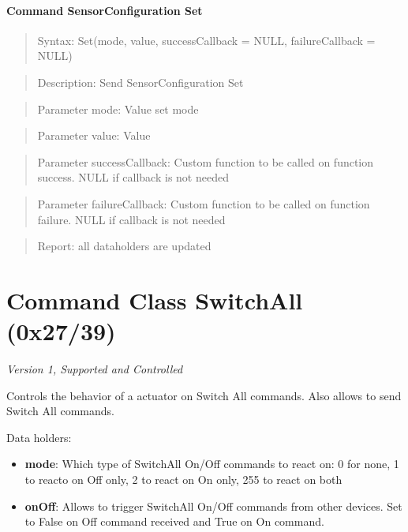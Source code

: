 \paragraph{Command SensorConfiguration Set}
\begin{quote}Syntax: Set(mode, value, successCallback = NULL, failureCallback = NULL)\end{quote}
\begin{quote}Description: Send SensorConfiguration Set\end{quote}
\begin{quote}Parameter mode: Value set mode\end{quote}
\begin{quote}Parameter value: Value\end{quote}
\begin{quote}Parameter successCallback: Custom function to be called on function success. NULL if callback is not needed\end{quote}
\begin{quote}Parameter failureCallback: Custom function to be called on function failure. NULL if callback is not needed\end{quote}
\begin{quote}Report: all dataholders are updated\end{quote}


\section{Command Class SwitchAll (0x27/39)}

\textit{Version 1, Supported and Controlled}
\newline

Controls the behavior of a actuator on Switch All commands. Also allows to send Switch All commands.
\newline

\noindent
Data holders:

\begin{itemize}
\item \textbf{mode}: Which type of SwitchAll On/Off commands to react on: 0 for none, 1 to reacto on Off only, 2 to react on On only, 255 to react on both
\item \textbf{onOff}: Allows to trigger SwitchAll On/Off commands from other devices. Set to False on Off command received and True on On command.
\end{itemize}


